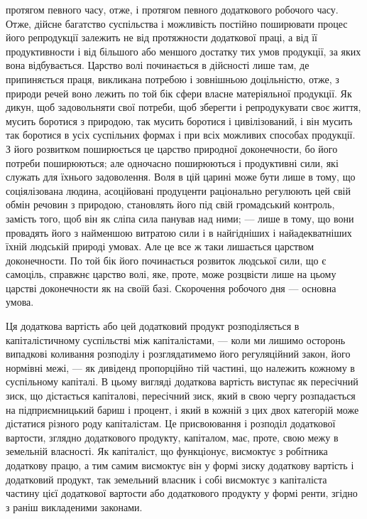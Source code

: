 \parcont{}  %
протягом певного часу, отже, і протягом певного додаткового робочого часу. Отже,
дійсне багатство суспільства і можливість постійно поширювати процес його
репродукції залежить не від протяжности додаткової праці, а від її продуктивности
і від більшого або меншого достатку тих умов продукції, за яких вона відбувається.
Царство волі починається в дійсності лише там, де припиняється праця,
викликана потребою і зовнішньою доцільністю, отже, з природи речей воно
лежить по той бік сфери власне матеріяльної продукції. Як дикун, щоб задовольняти
свої потреби, щоб зберегти і репродукувати своє життя, мусить боротися
з природою, так мусить боротися і цивілізований, і він мусить так боротися
в усіх суспільних формах і при всіх можливих способах продукції. З його
розвитком поширюється це царство природної доконечности, бо його потреби
поширюються; але одночасно поширюються і продуктивні сили, які служать
для їхнього задоволення. Воля в цій царині може бути лише в тому, що соціялізована
людина, асоційовані продуценти раціонально регулюють цей свій обмін
речовин з природою, становлять його під свій громадський контроль, замість того,
щоб він як сліпа сила панував над ними; — лише в тому, що вони провадять його
з найменшою витратою сили і в найгідніших і найадекватніших їхній людській
природі умовах. Але це все ж таки лишається царством доконечности. По той
бік його починається розвиток людської сили, що є самоціль, справжнє царство
волі, яке, проте, може розцвісти лише на цьому царстві доконечности як на
своїй базі. Скорочення робочого дня — основна умова.

Ця додаткова вартість або цей додатковий продукт розподіляється в капіталістичному
суспільстві між капіталістами, — коли ми лишимо осторонь випадкові
коливання розподілу і розглядатимемо його регуляційний закон, його нормівні
межі, — як дивіденд пропорційно тій частині, що належить кожному в суспільному
капіталі. В цьому вигляді додаткова вартість виступає як пересічний
зиск, що дістається капіталові, пересічний зиск, який в свою чергу розпадається
на підприємницький бариш і процент, і який в кожній з цих двох категорій
може дістатися різного роду капіталістам. Це присвоювання і розподіл додаткової
вартости, зглядно додаткового продукту, капіталом, має, проте, свою межу в земельній
власності. Як капіталіст, що функціонує, висмоктує з робітника додаткову
працю, а тим самим висмоктує він у формі зиску додаткову вартість
і додатковий продукт, так земельний власник і собі висмоктує з капіталіста
частину цієї додаткової вартости або додаткового продукту у формі ренти, згідно
з раніш викладеними законами.

